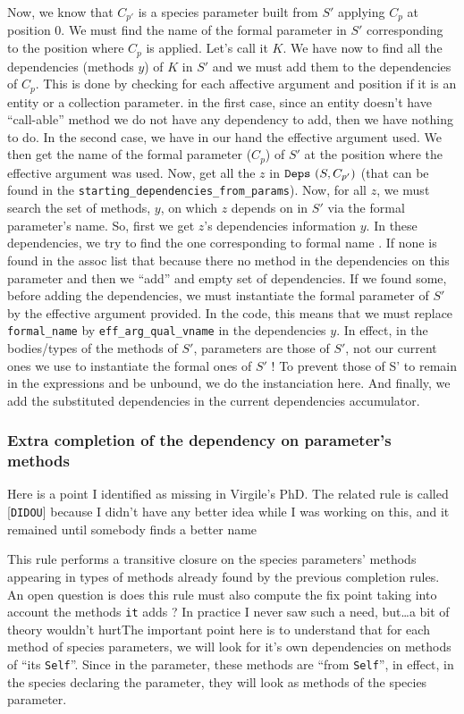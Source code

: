 \begin{enumerate}
  Now, we know that $C_{p'}$ is a species parameter built from $S'$
  applying $C_p$ at position 0. We must find the name of the formal
  parameter in $S'$ corresponding to the position where $C_p$ is
  applied. Let's call it $K$. We  have now to find all the
  dependencies (methods $y$) of $K$ in $S'$ and we must add them to
  the dependencies of $C_p$.
  This is done by checking for each affective argument and position if
  it is an entity or a collection parameter. in the first case, since
  an entity doesn't have ``call-able'' method we do not have any
  dependency to add, then we have nothing to do. In the second case,
  we have in our hand the effective argument used. We then get the
  name of the formal parameter ($C_p$) of $S'$ at the position where
  the effective argument was used. Now, get all the $z$ in
  ${\tt Deps}\ (S, C_{p'})$ (that can be found in the
  {\tt starting\_dependencies\_from\_params}). Now, for all $z$, we
  must search the set of methods, $y$, on which $z$ depends on in $S'$
  via the formal parameter's name. So, first we get $z$'s dependencies
  information $y$. In these dependencies, we try to find the one
  corresponding to formal name . If none is found in the assoc list
  that because there no method in the dependencies on this parameter
  and then we ``add'' and empty set of dependencies. If we found some,
  before adding the dependencies, we must instantiate the formal
  parameter of $S'$ by the effective argument provided. In the code,
  this means that we must replace {\tt formal\_name} by
  {\tt eff\_arg\_qual\_vname} in the dependencies $y$. In effect, in
  the bodies/types of the methods of $S'$, parameters are those of
  $S'$, not our current ones we use to instantiate the formal ones of
  $S'$ ! To prevent those of S' to remain in the expressions and be
  unbound, we do the instanciation here. And finally, we add the
  substituted dependencies in the current dependencies accumulator.
\end{enumerate}


\subsubsection{Extra completion of the dependency on parameter's methods}
Here is a point I identified as missing in Virgile's PhD. The related
rule is called [{\tt DIDOU}] because I didn't have any better idea
while I was working on this, and it remained until somebody finds a
better name \smiley

This rule performs a transitive closure on the species parameters'
methods appearing in types of methods already found by the previous
completion rules. An open question is does this rule must also compute
the fix point taking into account the methods {\tt it} adds ? In
practice I never saw such a need, but\ldots a bit of theory wouldn't
hurt\smiley The important point here is to understand that for each
method of species parameters, we will look for it's own dependencies
on methods of ``its {\tt Self}''. Since in the parameter, these
methods are ``from {\tt Self}'', in effect, in the species declaring
the parameter, they will look as methods of the species parameter.

